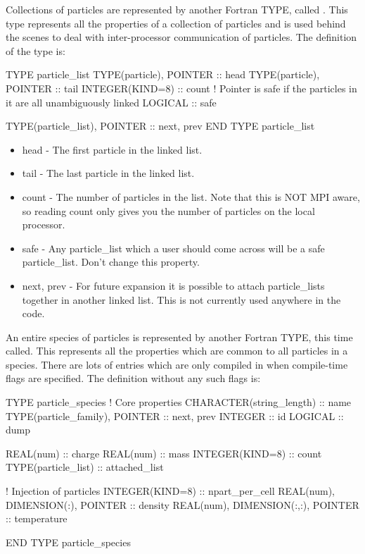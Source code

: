 Collections of particles are represented by another Fortran TYPE, called
. This type represents all the properties of a
collection of particles and is used behind the scenes to deal with
inter-processor communication of particles. The definition of the type is:
\begin{boxverbatim}
  TYPE particle_list
    TYPE(particle), POINTER :: head
    TYPE(particle), POINTER :: tail
    INTEGER(KIND=8) :: count
    ! Pointer is safe if the particles in it are all unambiguously linked
    LOGICAL :: safe

    TYPE(particle_list), POINTER :: next, prev
  END TYPE particle_list
\end{boxverbatim}
\begin{itemize}
\item head - The first particle in the linked list.
\item tail - The last particle in the linked list.
\item count - The number of particles in the list. Note that this is NOT MPI
  aware, so reading count only gives you the number of particles on the local
  processor.
\item safe - Any particle\_list which a user should come across will be a safe
  particle\_list. Don't change this property.
\item next, prev - For future expansion it is possible to attach particle\_lists
  together in another linked list. This is not currently used anywhere in the
  code.
\end{itemize}

An entire species of particles is represented by another Fortran TYPE, this
time called\linebreak {}. This represents all the
properties which are common to all particles in a species. There are lots
of entries which are only compiled in when compile-time flags are specified.
The definition without any such flags is:
\begin{boxverbatim}
  TYPE particle_species
    ! Core properties
    CHARACTER(string_length) :: name
    TYPE(particle_family), POINTER :: next, prev
    INTEGER :: id
    LOGICAL :: dump

    REAL(num) :: charge
    REAL(num) :: mass
    INTEGER(KIND=8) :: count
    TYPE(particle_list) :: attached_list

    ! Injection of particles
    INTEGER(KIND=8) :: npart_per_cell
    REAL(num), DIMENSION(:), POINTER :: density
    REAL(num), DIMENSION(:,:), POINTER :: temperature

  END TYPE particle_species
\end{boxverbatim}

